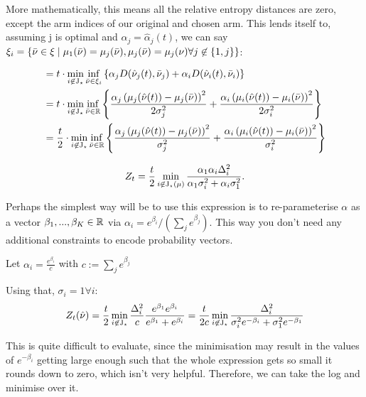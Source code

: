 More mathematically, this means all the relative entropy distances are zero, except the arm indices of our original and chosen arm. This lends itself to, assuming j is optimal and $\alpha_j = \hat{\alpha}_j(t)$, we can say $\xi_i = \{ \bar{\nu} \in \xi \mid \mu_{1}(\bar{\nu}) = \mu_{j}(\bar{\nu}) , \space \mu_{j}(\bar{\nu}) = \mu_{j}(\nu) \space \forall j \not\in \{1, j\} \}$:

\begin{align*}
&= t \cdot \min_{i \not\in \mathrm{J}_{\star}} \inf\limits_{\bar{\nu} \in \xi_i}\left\lbrace \alpha_j D(\hat{\nu}_{j}(t), \bar{\nu}_{j}) + \alpha_i D(\hat{\nu}_{i}(t), \bar{\nu}_{i})\right\rbrace
\\&= t \cdot \min_{i \not\in \mathrm{J}_{\star}} \inf\limits_{\bar{\nu} \in \mathbb{R}}\left\lbrace \frac{\alpha_j\left(\mu_{j}(\hat{\nu}(t))- \mu_{j}(\bar{\nu})\right)^2}{2\sigma_j^2} + \frac{\alpha_i\left(\mu_{i}(\hat{\nu}(t))- \mu_{i}(\bar{\nu})\right)^2}{2\sigma_i^2}\right\rbrace
\\&= \frac{t}{2} \cdot \min_{i \not\in \mathrm{J}_{\star}} \inf\limits_{\bar{\nu} \in \mathbb{R}}\left\lbrace \frac{\alpha_j\left(\mu_{j}(\hat{\nu}(t))- \mu_{j}(\bar{\nu})\right)^2}{\sigma_j^2} + \frac{\alpha_i\left(\mu_{i}(\hat{\nu}(t))- \mu_{i}(\bar{\nu})\right)^2}{\sigma_i^2}\right\rbrace
\end{align*}

$$
Z_t = \frac{t}{2}\min_{i \not\in \mathrm{J}_{\star}(\mu)}\frac{\alpha_1 \alpha_i \Delta_{i}^2}{\alpha_1 \sigma_i^2 + \alpha_i \sigma_1^2}.$$

Perhaps the simplest way will be to use this expression is to re-parameterise $\alpha$ as a vector $\beta_1,...,\beta_K \in \mathbb{R} $ via $ \alpha_i = e^{\beta_i}/(\sum_j e^{\beta_j})$. This way you don't need any additional constraints to encode probability vectors.

Let $\alpha_i = \frac{e^{\beta_i}}{c}$ with $c := \sum_j e^{\beta_j}$

Using that, $\sigma_i = 1 \forall i$:
$$Z_{t}(\hat{\nu}) = \frac{t}{2}\min_{i \not\in \mathrm{J}_{\star}}\frac{\Delta_{i}^2}{c} \frac{e^{\beta_1} e^{\beta_i}}{e^{\beta_1} + e^{\beta_i}}
=\frac{t}{2c}\min_{i \not\in \mathrm{J}_{\star}}   \frac{\Delta_i^2}{\sigma_i^2e^{-\beta_i} +\sigma_1^2 e^{-\beta_1} }$$

This is quite difficult to evaluate, since the minimisation may result in the values of $e^{-\beta_i}$ getting large enough such that the whole expression gets so small it rounds down to zero, which isn't very helpful. Therefore, we can take the log and minimise over it.

